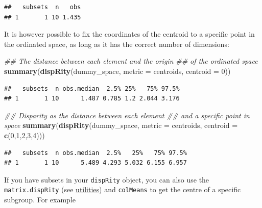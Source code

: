 \documentclass[]{book}
\newenvironment{Shaded}{\begin{snugshade}}{\end{snugshade}}
\newcommand{\CommentTok}[1]{\textcolor[rgb]{0.56,0.35,0.01}{\textit{#1}}}
\newcommand{\DataTypeTok}[1]{\textcolor[rgb]{0.13,0.29,0.53}{#1}}
\newcommand{\DecValTok}[1]{\textcolor[rgb]{0.00,0.00,0.81}{#1}}
\newcommand{\KeywordTok}[1]{\textcolor[rgb]{0.13,0.29,0.53}{\textbf{#1}}}
\newcommand{\NormalTok}[1]{#1}
\begin{document}
\begin{verbatim}
##   subsets  n   obs
## 1       1 10 1.435
\end{verbatim}

It is however possible to fix the coordinates of the centroid to a specific point in the ordinated space, as long as it has the correct number of dimensions:

\begin{Shaded}
\begin{Highlighting}[]
\CommentTok{## The distance between each element and the origin}
\CommentTok{## of the ordinated space}
\KeywordTok{summary}\NormalTok{(}\KeywordTok{dispRity}\NormalTok{(dummy_space, }\DataTypeTok{metric =}\NormalTok{ centroids, }\DataTypeTok{centroid =} \DecValTok{0}\NormalTok{))}
\end{Highlighting}
\end{Shaded}

\begin{verbatim}
##   subsets  n obs.median  2.5% 25%   75% 97.5%
## 1       1 10      1.487 0.785 1.2 2.044 3.176
\end{verbatim}

\begin{Shaded}
\begin{Highlighting}[]
\CommentTok{## Disparity as the distance between each element}
\CommentTok{## and a specific point in space}
\KeywordTok{summary}\NormalTok{(}\KeywordTok{dispRity}\NormalTok{(dummy_space, }\DataTypeTok{metric =}\NormalTok{ centroids,}
                 \DataTypeTok{centroid =} \KeywordTok{c}\NormalTok{(}\DecValTok{0}\NormalTok{,}\DecValTok{1}\NormalTok{,}\DecValTok{2}\NormalTok{,}\DecValTok{3}\NormalTok{,}\DecValTok{4}\NormalTok{)))}
\end{Highlighting}
\end{Shaded}

\begin{verbatim}
##   subsets  n obs.median  2.5%   25%   75% 97.5%
## 1       1 10      5.489 4.293 5.032 6.155 6.957
\end{verbatim}

If you have subsets in your \texttt{dispRity} object, you can also use the \texttt{matrix.dispRity} (see \protect\hyperlink{utilities}{utilities}) and \texttt{colMeans} to get the centre of a specific subgroup.
For example
\end{document}
